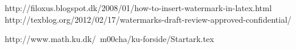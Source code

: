 
http://filoxus.blogspot.dk/2008/01/how-to-insert-watermark-in-latex.html
http://texblog.org/2012/02/17/watermarks-draft-review-approved-confidential/

http://www.math.ku.dk/~m00cha/ku-forside/Startark.tex